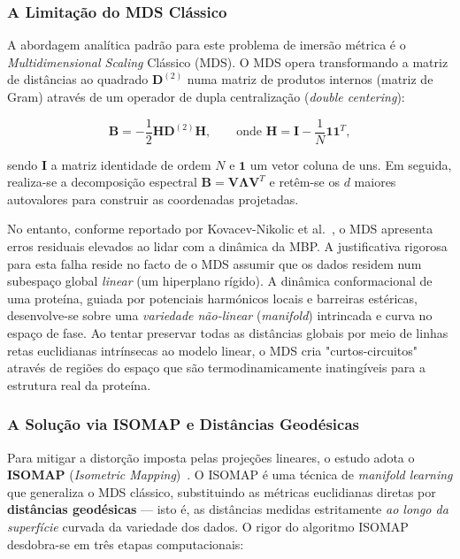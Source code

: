\documentclass[12pt, a4paper]{article}
\begin{document}
\subsubsection{A Limitação do MDS Clássico}

A abordagem analítica padrão para este problema de imersão métrica é o \textit{Multidimensional Scaling} Clássico (MDS). O MDS opera transformando a matriz de distâncias ao quadrado $\mathbf{D}^{(2)}$ numa matriz de produtos internos (matriz de Gram) através de um operador de dupla centralização (\textit{double centering}):

\begin{equation}\label{eq:mds_centering}
\mathbf{B} = -\frac{1}{2} \mathbf{H} \mathbf{D}^{(2)} \mathbf{H}, \qquad \text{onde } \mathbf{H} = \mathbf{I} - \frac{1}{N}\mathbf{1}\mathbf{1}^T,
\end{equation}

sendo $\mathbf{I}$ a matriz identidade de ordem $N$ e $\mathbf{1}$ um vetor coluna de uns. Em seguida, realiza-se a decomposição espectral $\mathbf{B} = \mathbf{V} \mathbf{\Lambda} \mathbf{V}^T$ e retêm-se os $d$ maiores autovalores para construir as coordenadas projetadas.

No entanto, conforme reportado por Kovacev-Nikolic et al.~\cite{kovacev2016}, o MDS apresenta erros residuais elevados ao lidar com a dinâmica da MBP. A justificativa rigorosa para esta falha reside no facto de o MDS assumir que os dados residem num subespaço global \emph{linear} (um hiperplano rígido). A dinâmica conformacional de uma proteína, guiada por potenciais harmónicos locais e barreiras estéricas, desenvolve-se sobre uma \emph{variedade não-linear} (\textit{manifold}) intrincada e curva no espaço de fase. Ao tentar preservar todas as distâncias globais por meio de linhas retas euclidianas intrínsecas ao modelo linear, o MDS cria "curtos-circuitos" através de regiões do espaço que são termodinamicamente inatingíveis para a estrutura real da proteína.

\subsubsection{A Solução via ISOMAP e Distâncias Geodésicas}

Para mitigar a distorção imposta pelas projeções lineares, o estudo adota o \textbf{ISOMAP} (\textit{Isometric Mapping})~\cite{Tenenbaum2000}. O ISOMAP é uma técnica de \textit{manifold learning} que generaliza o MDS clássico, substituindo as métricas euclidianas diretas por \textbf{distâncias geodésicas} — isto é, as distâncias medidas estritamente \emph{ao longo da superfície} curvada da variedade dos dados. O rigor do algoritmo ISOMAP desdobra-se em três etapas computacionais:
\end{document}
